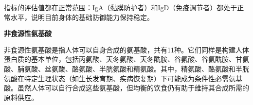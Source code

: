 \documentclass[UTF8]{ctexart}
\begin{document}
\begin{center}
\end{center}

\begin{tcolorbox}[
    enhanced,
    colback=gray!3,
    colframe=gray!3,
    arc=3mm,
    boxrule=0pt,
    width=\textwidth,
    top=8pt,
    bottom=8pt
]
{\small{\textcolor{green!85!orange}{\faLightbulb}}\quad 指标的评估值都在正常范围：IgA（黏膜防护者）和IgD（免疫调节者）都处于正常水平，说明目前身体的基础防御能力保持稳定。
}

\end{tcolorbox}

\newpage

\begin{tcolorbox}[
    enhanced,
    colback=blue!3,
    colframe=gray!3,
    arc=3mm,
    boxrule=0pt,
    width=\textwidth,
    top=8pt,
    bottom=8pt
]
{\large \textbf{非食源性氨基酸}}

\vspace{0.1cm}
{\small {\color{customTeal}\faInfoCircle} 非食源性氨基酸是指人体可以自身合成的氨基酸，共有11种。它们同样是构建人体蛋白质的基本单位，包括丙氨酸、天冬氨酸、天冬酰胺、谷氨酸、谷氨酰胺、甘氨酸、脯氨酸、丝氨酸、酪氨酸、半胱氨酸和精氨酸。其中，精氨酸、酪氨酸和半胱氨酸在特定生理状态（如生长发育期、疾病恢复期）下可能成为条件性必需氨基酸。虽然人体可以自行合成这些氨基酸，但均衡的饮食仍有助于维持其合成所需的原料供应。}
\end{tcolorbox}
\end{document}
